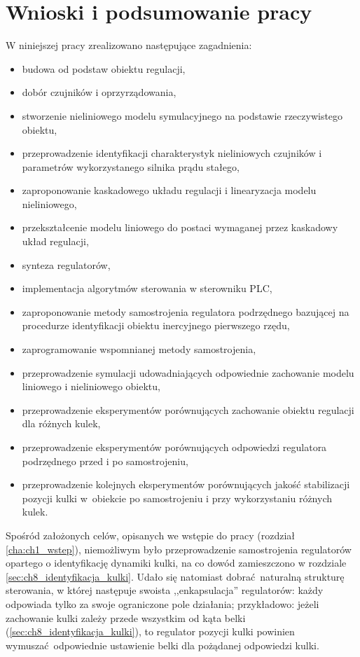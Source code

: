 \chapter{Wnioski i podsumowanie pracy}
\label{cha:ch10_wnioski}

W niniejszej pracy zrealizowano następujące zagadnienia:
\begin{itemize}
    \item budowa od podstaw obiektu regulacji,
    \item dobór czujników i oprzyrządowania,
    \item stworzenie nieliniowego modelu symulacyjnego na podstawie rzeczywistego obiektu,
    \item przeprowadzenie identyfikacji charakterystyk nieliniowych czujników i parametrów wykorzystanego silnika prądu stałego,
    \item zaproponowanie kaskadowego układu regulacji i linearyzacja modelu nieliniowego,
    \item przekształcenie modelu liniowego do postaci wymaganej przez kaskadowy układ regulacji,
    \item synteza regulatorów,
    \item implementacja algorytmów sterowania w sterowniku PLC,
    \item zaproponowanie metody samostrojenia regulatora podrzędnego bazującej na procedurze identyfikacji obiektu inercyjnego pierwszego rzędu,
    \item zaprogramowanie wspomnianej metody samostrojenia,
    \item przeprowadzenie symulacji udowadniających odpowiednie zachowanie modelu liniowego i nieliniowego obiektu,
    \item przeprowadzenie eksperymentów porównujących zachowanie obiektu regulacji dla różnych kulek,
    \item przeprowadzenie eksperymentów porównujących odpowiedzi regulatora podrzędnego przed i po samostrojeniu,
    \item przeprowadzenie kolejnych eksperymentów porównujących jakość stabilizacji pozycji kulki w~obiekcie po samostrojeniu i przy wykorzystaniu różnych kulek.
\end{itemize}

Spośród założonych celów, opisanych we wstępie do pracy (rozdział \ref{cha:ch1_wstep}), niemożliwym było przeprowadzenie samostrojenia regulatorów opartego o identyfikację dynamiki kulki, na co dowód zamieszczono w rozdziale \ref{sec:ch8_identyfikacja_kulki}. Udało się natomiast dobrać naturalną strukturę sterowania, w której następuje swoista ,,enkapsulacja'' regulatorów: każdy odpowiada tylko za swoje ograniczone pole działania; przykładowo: jeżeli zachowanie kulki zależy przede wszystkim od kąta belki (\ref{sec:ch8_identyfikacja_kulki}), to regulator pozycji kulki powinien wymuszać odpowiednie ustawienie belki dla pożądanej odpowiedzi kulki.

